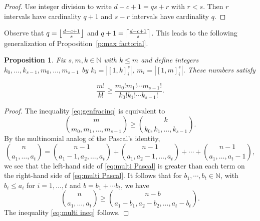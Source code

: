 \documentclass[12pt]{amsart}
\DeclarePairedDelimiter\ceil{\lceil}{\rceil}
\DeclarePairedDelimiter\floor{\lfloor}{\rfloor}
\newtheorem{prop}[thm]{Proposition}
\theoremstyle{definition}
\numberwithin{equation}{section}
\begin{document}
\begin{proof}
Use integer division to write
$d-c+1=qs +r$
with $r<s$. Then $r$ intervals have cardinality $q+1$ and $s-r$ intervals have cardinality $q$.
\end{proof}

Observe that $q=\floor*{\frac{d-c+1}{s}}$ and $q+1 = \ceil*{\frac{d-c+1}{s}}$. This leads to the following generalization of Proposition~\ref{p:max factorial}.
\begin{prop}
Fix $s,m,k \in \mathbb{N}$ with $k\leq m$ and define integers $k_0, \dotsc, k_{s-1}, m_0, \dotsc, m_{s-1}$ by $k_i=|[1,k]_i^s|$, $m_i=|[1,m]_i^s|$. These numbers satisfy

\begin{equation}\label{eq:genfracinq}
        \frac{m!}{k!} \geq \frac{m_0! m_1! \cdots
         m_{s-1}!}{k_0! k_1! \cdots k_{s-1}!}.
    \end{equation}

\end{prop}

\begin{proof}

The inequality \eqref{eq:genfracinq} is equivalent to
\begin{equation}\label{eq:multi ineq}{ m \choose {m_0,m_1,\dotsc,m_{s-1}}} \geq {k\choose k_0,k_1,\dotsc,k_{s-1}}.
\end{equation}
By the multinomial analog of the Pascal's identity,
\begin{equation}\label{eq:multi Pascal}
{n \choose a_1, \dotsc, a_t}={n-1 \choose a_1-1, a_2, \dotsc, a_t}+ {n-1 \choose a_1, a_2-1, \dotsc, a_t}+\cdots+ {n-1 \choose a_1, \dotsc, a_t-1},
\end{equation}
we see that the left-hand side of \eqref{eq:multi Pascal} is greater than each term on the right-hand side of \eqref{eq:multi Pascal}.
It follows that for $b_1, \cdots, b_t\in\mathbb{N}$, with $b_i\leq a_i$ for $i=1, \dotsc, t$ and $b=b_1+\cdots b_t$, we have
\begin{equation*}
{n \choose a_1, \dotsc, a_t}\geq {n-b \choose a_1-b_1, a_2-b_2, \dotsc, a_t-b_t}.\end{equation*} The inequality \eqref{eq:multi ineq} follows.
\end{proof}
\end{document}

